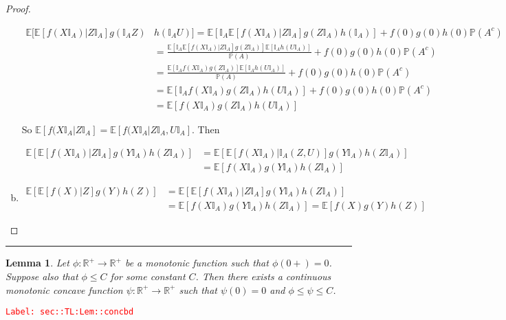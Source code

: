 \documentclass[12pt]{article}
\newcommand{\mb}{\mathbb}
\newcommand{\ra}{\rightarrow}
\newcommand{\tr}{\textcolor{red}}
\newcommand{\labe}[1]{\tr{\texttt{Label: #1}}}
\newcommand{\lin}{\rule{\linewidth}{0.4 pt}}
\newcommand{\pr}{\mb{P}}							%
\newcommand{\ex}[1]{\mb{E}\left[#1\right]}			%
\newcommand{\X}{X}								%
\newcommand{\XX}{Y}								%
\newcommand{\XXX}{Z}							%
\newcommand{\typset}{A}							%
\newtheorem{lem}[thms]{Lemma}
\begin{document}
\begin{proof}
\begin{enumerate}[(a)]
\begin{align*}
\mb{E}\bigg[\ex{f(\X\mb{I}_\typset)| \XXX\mb{I}_\typset}g(\mb{I}_\typset\XXX)&h(\mb{I}_\typset U)\bigg] = \ex{\mb{I}_\typset\ex{f(\X\mb{I}_\typset)|\XXX\mb{I}_\typset}g(\XXX\mb{I}_\typset)h(\mb{I}_\typset)} + f(0)g(0)h(0)\pr(\typset^c)\\
&=\frac{\ex{\mb{I}_\typset\ex{f(\X\mb{I}_\typset)|\XXX\mb{I}_\typset}g(\XXX\mb{I}_\typset)}\ex{\mb{I}_\typset h(U\mb{I}_\typset)}}{\pr(\typset)} + f(0)g(0)h(0)\pr(\typset^c)\\
&=\frac{\ex{\mb{I}_\typset f(\X\mb{I}_\typset)g(\XXX\mb{I}_\typset)}\ex{\mb{I}_\typset h(U\mb{I}_\typset)}}{\pr(\typset)} + f(0)g(0)h(0)\pr(\typset^c)\\
&=\ex{\mb{I}_\typset f(\X\mb{I}_\typset)g(\XXX\mb{I}_\typset)h(U\mb{I}_\typset)} + f(0)g(0)h(0)\pr(\typset^c)\\
&= \ex{f(\X\mb{I}_\typset)g(\XXX\mb{I}_\typset)h(U\mb{I}_\typset)}
\end{align*}

So \(\ex{f(\X\mb{I}_\typset|\XXX\mb{I}_\typset} = \ex{f(\X\mb{I}_\typset|\XXX\mb{I}_\typset,U\mb{I}_\typset}\). Then 

\begin{align*}
\ex{\ex{f(\X\mb{I}_\typset)|\XXX\mb{I}_\typset}g(\XX\mb{I}_\typset)h(\XXX\mb{I}_\typset)} &= \ex{\ex{f(\X\mb{I}_\typset)|\mb{I}_\typset(\XXX,U)}g(\XX\mb{I}_\typset)h(\XXX\mb{I}_\typset)}\\
&=\ex{f(\X\mb{I}_\typset)g(\XX\mb{I}_\typset)h(\XXX\mb{I}_\typset)}
\end{align*}

\item 
\begin{align*}
\ex{\ex{f(\X)|\XXX}g(\XX)h(\XXX)} &= \ex{\ex{f(\X\mb{I}_\typset)|\XXX\mb{I}_\typset}g(\XX\mb{I}_\typset)h(\XXX\mb{I}_\typset)}\\
&= \ex{f(\X\mb{I}_\typset)g(\XX\mb{I}_\typset)h(\XXX\mb{I}_\typset)} = \ex{f(\X)g(\XX)h(\XXX)}
\end{align*}
\end{enumerate}
\end{proof}

\lin

\begin{lem}
Let \(\phi: \mb{R}^+ \ra \mb{R}^+\) be a monotonic function such that \(\phi(0+) = 0\). Suppose also that \(\phi \leq C\) for some constant \(C\). Then there exists a continuous monotonic concave function \(\psi:\mb{R}^+\ra \mb{R}^+\) such that \(\psi(0) = 0\) and \(\phi \leq \psi\leq C\).
\label{sec::TL:Lem::concbd}
\end{lem}
\labe{sec::TL:Lem::concbd}
\end{document}
